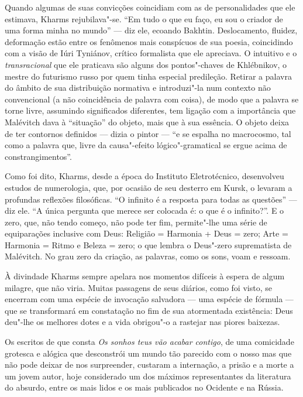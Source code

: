 Quando algumas de suas convicções coincidiam com as de personalidades
que ele estimava, Kharms rejubilava"-se. ``Em tudo o que eu faço, eu sou
o criador de uma forma minha no mundo'' --- diz ele, ecoando Bakhtin.
Deslocamento, fluidez, deformação estão entre os fenômenos mais
conspícuos de sua poesia, coincidindo com a visão de Iúri Tyniánov,
crítico formalista que ele apreciava. O intuitivo e o
\emph{transracional} que ele praticava são alguns dos pontos"-chaves de
Khlébnikov, o mestre do futurismo russo por quem tinha especial
predileção. Retirar a palavra do âmbito de sua distribuição normativa e
introduzi"-la num contexto não convencional (a não coincidência de
palavra com coisa), de modo que a palavra se torne livre, assumindo
significados diferentes, tem ligação com a importância que Malévitch
dava à ``situação'' do objeto, mais que à sua essência. O objeto deixa
de ter contornos definidos --- dizia o pintor --- ``e se espalha no
macrocosmo, tal como a palavra que, livre da causa"-efeito
lógico"-gramatical se ergue acima de constrangimentos''.

Como foi dito, Kharms, desde a época do Instituto Eletrotécnico,
desenvolveu estudos de numerologia, que, por ocasião de seu desterro em
Kursk, o levaram a profundas reflexões filosóficas. ``O infinito é a
resposta para todas as questões'' --- diz ele. ``A única pergunta que
merece ser colocada é: o que é o infinito?''. E o zero, que, não tendo
começo, não pode ter fim, permite"-lhe uma série de equiparações
inclusive com Deus: Religião = Harmonia + Deus = zero; Arte = Harmonia =
Ritmo e Beleza = zero; o que lembra o Deus"-zero suprematista de
Malévitch. No grau zero da criação, as palavras, como os sons, voam e
ressoam.

À divindade Kharms sempre apelara nos momentos difíceis à espera de
algum milagre, que não viria. Muitas passagens de seus diários, como foi
visto, se encerram com uma espécie de invocação salvadora --- uma espécie
de fórmula --- que se transformará em constatação no fim de sua
atormentada existência: Deus deu"-lhe os melhores dotes e a vida
obrigou"-o a rastejar nas piores baixezas.

Os escritos de que consta \emph{Os sonhos teus vão acabar contigo}, de uma comicidade grotesca e
alógica que desconstrói um mundo tão parecido com o nosso mas que não
pode deixar de nos surpreender, custaram a internação, a prisão e a
morte a um jovem autor, hoje considerado um dos máximos representantes
da literatura do absurdo, entre os mais lidos e os mais publicados no
Ocidente e na Rússia.



